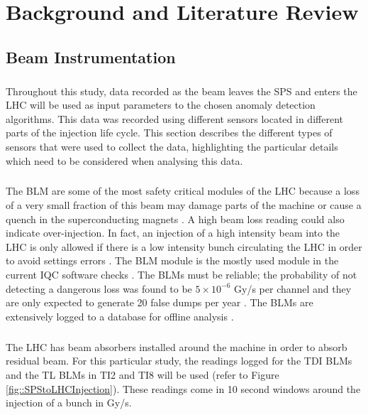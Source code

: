 \chapter{Background and Literature Review}


\section{Beam Instrumentation}
\label{sec::beam_instrumentation}
\paragraph{ }Throughout this study, data recorded as the beam leaves the \acs{SPS} and enters the \acs{LHC} will be used as input parameters to the chosen anomaly detection algorithms. This data was recorded using different sensors located in different parts of the injection life cycle. This section describes the different types of sensors that were used to collect the data, highlighting the particular details which need to be considered when analysing this data.

\paragraph{ }The \ac{BLM} are some of the most safety critical modules of the \acs{LHC} because a loss of a very small fraction of this beam may damage parts of the machine or cause a quench in the superconducting magnets \cite{Holzer2006}. A high beam loss reading could also indicate over-injection. In fact, an injection of a high intensity beam into the LHC is only allowed if there is a low intensity bunch circulating the LHC in order to avoid settings errors \cite{Kain2010}. The \acs{BLM} module is the mostly used module in the current IQC software checks \cite{Drosdal2011}. The \acs{BLM}s must be reliable; the probability of not detecting a dangerous loss was found to be $5\times10^{-6}$ Gy/s per channel and they are only expected to generate 20 false dumps per year \cite{Holzer2006}. The \acs{BLM}s are extensively logged to a database for offline analysis \cite{Holzer2006}. 

\paragraph{ }The \acs{LHC} has beam absorbers installed around the machine in order to absorb residual beam. For this particular study, the readings logged for the \ac{TDI} \acs{BLM}s and the \ac{TL} \acs{BLM}s in TI2 and TI8 will be used (refer to Figure \ref{fig::SPStoLHCInjection}). These readings come in 10 second windows around the injection of a bunch in \ac{Gy/s}.

